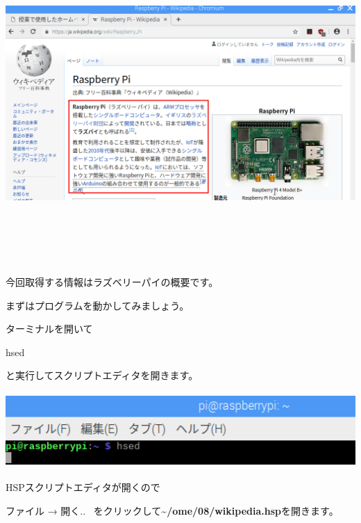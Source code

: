 \documentclass[a4paper,12pt,dvipdfmx]{jarticle}
\begin{document}
\begin{center}
\includegraphics[width=17.006cm,height=12.157cm]{textbook-img059.png}

\end{center}
今回取得する情報はラズベリーパイの概要です。

まずはプログラムを動かしてみましょう。

ターミナルを開いて

hsed

と実行してスクリプトエディタを開きます。



\begin{center}
\includegraphics[width=17.057cm,height=2.866cm]{textbook-img013.png}

\end{center}

\bigskip

\clearpage
HSPスクリプトエディタが開くので


\bigskip

ファイル → 開く..
\ をクリックして\textbf{\~{}/ome/08/wikipedia.hsp}を開きます。
\end{document}
